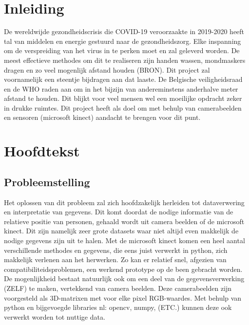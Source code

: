 \documentclass[a4paper,11pt]{article}
\begin{document}
	\begin{abstract}
		
	\end{abstract}
	
	
	
	\tableofcontents
	\newpage
	
	
	
	
	
	
	
	
	\section{Inleiding}
		De wereldwijde gezondheidscrisis die COVID-19 veroorzaakte in 2019-2020 heeft tal van middelen en energie gestuurd naar de gezondheidszorg. Elke inspanning om de verspreiding van het virus in te perken moet en zal geleverd worden. De meest effectieve methodes om dit te realiseren zijn handen wassen, mondmaskers dragen en zo veel mogenlijk afstand houden (BRON). Dit project zal voornamelijk een steentje bijdragen aan dat laaste. De Belgische veiligheidsraad en de WHO raden aan om in het bijzijn van andereminstens anderhalve meter afstand te houden. Dit blijkt voor veel mensen wel een moeilijke opdracht zeker in drukke ruimtes. Dit project heeft als doel om met behulp van camerabeelden en sensoren (microsoft kinect) aandacht te brengen voor dit punt.
		
	\section{Hoofdtekst}
	\subsection{Probleemstelling}
		Het oplossen van dit probleem zal zich hoofdzakelijk herleiden tot dataverwering en interpretatie van gegevens. Dit komt doordat de nodige informatie van de relatieve positie van personen, gehaald wordt uit camera beelden of de microsoft kinect. Dit zijn namelijk zeer grote datasets waar niet altijd even makkelijk de nodige gegevens zijn uit te halen.
		Met de microsoft kinect komen een heel aantal verschillende methodes en gegevens, die eens juist verwerkt in python, zich makkelijk verlenen aan het herwerken. Zo kan er relatief snel, afgezien van compatibiliteidsproblemen, een werkend prototype op de been gebracht worden. De mogenlijkheid bestaat natuurlijk ook om een deel van de gegevensverwerking (ZELF) te maken, vertekkend van camera beelden. Deze camerabeelden zijn voorgesteld als 3D-matrixen met voor elke pixel RGB-waardes. Met behulp van python en bijgevoegde libraries nl: opencv, numpy, (ETC.) kunnen deze ook verwerkt worden tot nuttige data.     
\end{document}
